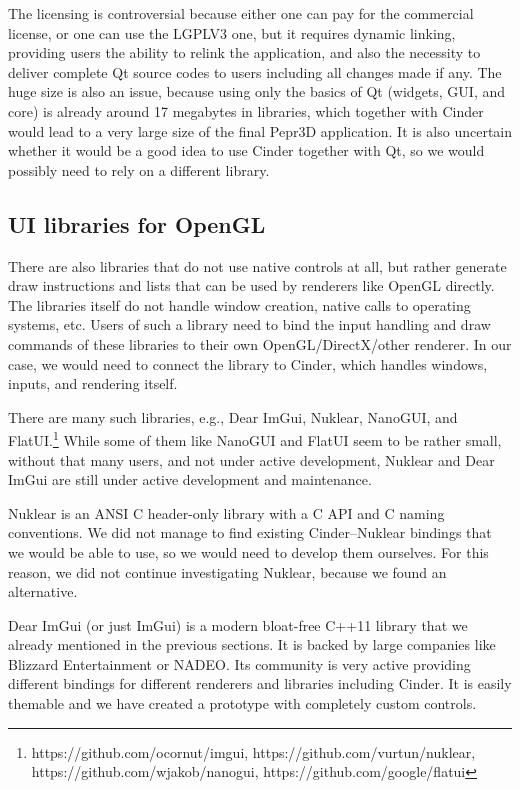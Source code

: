 The licensing is controversial because either one can pay for the commercial license, or one can use the LGPLV3 one, but it requires dynamic linking, providing users the ability to relink the application, and also the necessity to deliver complete Qt source codes to users including all changes made if any.
The huge size is also an issue, because using only the basics of Qt (widgets, GUI, and core) is already around 17 megabytes in libraries, which together with Cinder would lead to a very large size of the final Pepr3D application.
It is also uncertain whether it would be a good idea to use Cinder together with Qt, so we would possibly need to rely on a different library.

\subsection{UI libraries for OpenGL}

There are also libraries that do not use native controls at all, but rather generate draw instructions and lists that can be used by renderers like OpenGL directly.
The libraries itself do not handle window creation, native calls to operating systems, etc.
Users of such a library need to bind the input handling and draw commands of these libraries to their own OpenGL/DirectX/other renderer.
In our case, we would need to connect the library to Cinder, which handles windows, inputs, and rendering itself.

There are many such libraries, e.g., Dear ImGui, Nuklear, NanoGUI, and FlatUI.\footnote{https://github.com/ocornut/imgui, https://github.com/vurtun/nuklear, https://github.com/wjakob/nanogui, https://github.com/google/flatui}
While some of them like NanoGUI and FlatUI seem to be rather small, without that many users, and not under active development, Nuklear and Dear ImGui are still under active development and maintenance.

Nuklear is an ANSI C header-only library with a C API and C naming conventions.
We did not manage to find existing Cinder--Nuklear bindings that we would be able to use, so we would need to develop them ourselves.
For this reason, we did not continue investigating Nuklear, because we found an alternative.

Dear ImGui (or just ImGui) is a modern bloat-free C++11 library that we already mentioned in the previous sections.
It is backed by large companies like Blizzard Entertainment or NADEO.
Its community is very active providing different bindings for different renderers and libraries including Cinder.
It is easily themable and we have created a prototype with completely custom controls.

